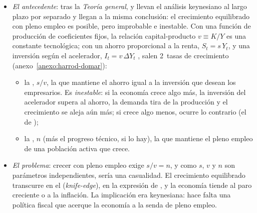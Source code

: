 \documentclass[11pt]{article}
\begin{document}
\begin{itemize}
\item \emph{El antecedente}: tras la \emph{Teoría general}, \textcite{Harrod1939} y \textcite{Domar1946} llevan el análisis keynesiano al largo plazo por separado y llegan a la misma conclusión: el crecimiento equilibrado con pleno empleo es posible, pero improbable e inestable. Con una función de producción de coeficientes fijos, la relación capital-producto $v\equiv K/Y$ es una constante tecnológica; con un ahorro proporcional a la renta, $S_t=s\,Y_t$, y una inversión según el acelerador, $I_t=v\,\Delta Y_t$ , salen 2~tasas de crecimiento (anexo~\ref{anexo:harrod-domar}):
  \begin{itemize}
  \item la , $s/v$, la que mantiene el ahorro igual a la inversión que desean los empresarios. Es \emph{inestable}: si la economía crece algo más, la inversión del acelerador supera al ahorro, la demanda tira de la producción y el crecimiento se aleja aún más; si crece algo menos, ocurre lo contrario (el  de );
  \item la , $n$ (más el progreso técnico, si lo hay), la que mantiene el pleno empleo de una población activa que crece.
  \end{itemize}
\item \emph{El problema}: crecer con pleno empleo exige $s/v=n$, y como $s$, $v$ y $n$ son parámetros independientes, sería una casualidad. El crecimiento equilibrado transcurre en el  (\emph{knife-edge}), en la expresión de \textcite[p.~65]{Solow1956}, y la economía tiende al paro creciente o a la inflación. La implicación era keynesiana: hace falta una política fiscal que acerque la economía a la senda de pleno empleo.

\end{itemize}
\end{document}
